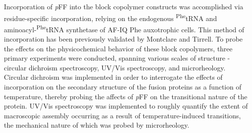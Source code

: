 \begin{refsection}


Incorporation of \emph{p}FF into the block copolymer constructs was accomplished
via residue-specific incorporation, relying on the endogenous
\textsuperscript{Phe}tRNA and aminoacyl-\textsuperscript{Phe}tRNA synthetase of
AF-IQ Phe auxotrophic cells. This method of incorporation has been previously
validated by Montclare and
Tirrell.\cite{Voloshchuk2009,Panchenko2006,Baker2011,Sharma2000,Yoshikawa1994}
To probe the effects on the physicochemical behavior of these block copolymers,
three primary experiments were conducted, spanning various scales of structure -
circular dichroism spectroscopy, UV/Vis spectroscopy, and microrheology.
Circular dichroism was implemented in order to interrogate the effects of
incorporation on the secondary structure of the fusion proteins as a function of
temperature, thereby probing the affects of \emph{p}FF on the transitional
nature of the protein. UV/Vis spectroscopy was implemented to roughly quantify
the extent of macroscopic assembly occurring as a result of temperature-induced
transitions, the mechanical nature of which was probed by microrheology. 


\end{refsection}
